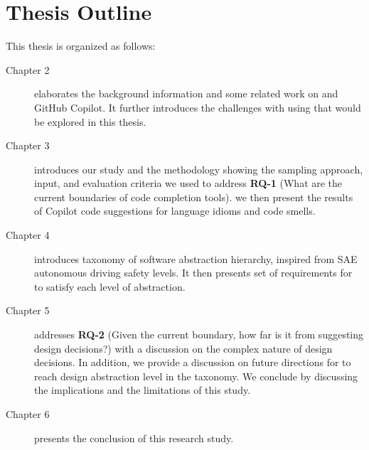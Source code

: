\section{Thesis Outline}

This thesis is organized as follows:

\begin{description}
\item[Chapter 2] elaborates the background information and some related work on \cct{} and GitHub Copilot. It further introduces the challenges with using \cct{} that would be explored in this thesis.
\item[Chapter 3] introduces our study and the methodology showing the sampling approach, input, and evaluation criteria we used to address \textbf{RQ-1} (What are the current boundaries of code completion tools).
we then present the results of Copilot code suggestions for language idioms and code smells.
\item[Chapter 4] introduces taxonomy of software abstraction hierarchy, inspired from SAE autonomous driving safety levels. It then presents set of requirements for \cct{} to satisfy each level of abstraction.
\item[Chapter 5] addresses \textbf{RQ-2} (Given the current boundary, how far is it from suggesting design decisions?) with a discussion on the complex nature of design decisions. In addition, we provide a discussion on future directions for \cct{} to reach design abstraction level in the taxonomy. 
We conclude by discussing the implications and the limitations of this study.
\item[Chapter 6] presents the conclusion of this research study.
\end{description}


